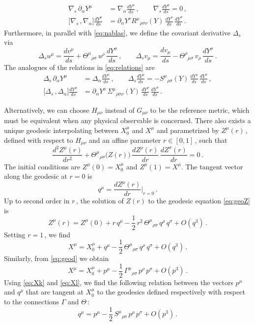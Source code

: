 \documentclass[11pt]{article}
\newcommand{\be}{\begin{equation}}
\newcommand{\ee}{\end{equation}}
\newcommand{\p}{\partial}
\begin{document}
%
\begin{subequations} \label{eq:relations}
\begin{align}
	\nabla_{\!s} \, \p_\alpha Y^\mu & = \nabla_{\!\alpha} \frac{dY^\mu}{ds}\,,
		\qquad
	\nabla_{\!s} \frac{dY^\mu}{ds} = 0\,, \\[4pt]
	\bigl[ \nabla_{\!s} \,, \! \nabla_{\!\alpha} \bigr] \frac{dY^\mu}{ds} & = \p_\alpha Y^\nu R^\mu{}_{\rho\sigma\nu} (Y) \, \frac{dY^\rho}{ds} \, \frac{dY^\sigma}{ds}\,.
\end{align}
\end{subequations}
%
Furthermore, in parallel with \eqref{eq:nablas}, we define the covariant derivative $\Delta_s$ via
%
\be
	\Delta_s u^\mu = \frac{d v^\mu}{ds} + \Theta^\mu{}_{\rho\sigma} \, u^\rho \, \frac{dY^\sigma}{ds}\,,
		\qquad
	\Delta_s v_\mu = \frac{dv_\mu}{ds} - \Theta^\rho{}_{\mu\sigma} \, v_\rho \, \frac{dY^\sigma}{ds} \,.
\ee
%
The analogues of the relations in \eqref{eq:relations} are
%
\begin{subequations}
\begin{align}
	\Delta_s \, \p_\alpha Y^\mu & = \Delta_\alpha \frac{dY^\mu}{ds}\,,
		\qquad
	\Delta_s \frac{dY^\mu}{ds} = - S^\mu{}_{\rho\sigma} (Y) \, \frac{dY^\rho}{ds} \, \frac{dY^\sigma}{ds}\,, \\[4pt]
	\bigl[ \Delta_s\,, \Delta_\alpha \bigr] \frac{dY^\mu}{ds} & = \p_\alpha Y^\nu \, \Sigma^\mu{}_{\rho\sigma\nu} (Y) \, \frac{dY^\rho}{ds} \, \frac{dY^\sigma}{ds}\,.
\end{align}
\end{subequations}
%

Alternatively, we can choose $H_{\mu\nu}$ instead of $G_{\mu\nu}$ to be the reference metric, which must be equivalent when any physical observable is concerned. There also exists a unique geodesic interpolating between $X_0^\mu$ and $X^\mu$ and parametrized by ${Z}^\mu (r)$\,, defined with respect to $H_{\mu\nu}$ and an affine parameter $r \in [0,1]$\,, such that
%
\be \label{eq:geoZ}
	\frac{d^2 {Z}^\mu (r)}{d r^2} + \Theta^\mu{}_{\rho\sigma} \bigl(Z(r)\bigr) \, \frac{d {Z}^\rho (r)}{dr} \, \frac{d {Z}^\sigma (r)}{d r} = 0\,.
\ee  
%
The initial conditions are ${Z}^\mu (0) = X_0^\mu$ and ${Z}^\mu (1) = X^\mu$. The tangent vector along the geodesic at $r=0$ is
%
\be \label{eq:defk}
	q^\mu = \frac{d{Z}^\mu(r)}{dr} \bigg|_{r=0}\,.
\ee
%
Up to second order in $r$\,, the solution of $Z(r)$ to the geodesic equation \eqref{eq:geoZ} is
%
\be
	Z^\mu (r) = Z^\mu (0) + r \, q^\mu - \frac{1}{2} \, r^2 \, \Theta^\mu{}_{\rho\sigma} \, q^\rho \, q^\sigma + O(q^3)\,.
\ee
%
Setting $r = 1$\,, we find
%
\be \label{eq:Xk}
	X^\mu = X_0^\mu + q^\mu - \frac{1}{2} \, \Theta^\mu{}_{\rho\sigma} \, q^\rho \, q^\sigma + O(q^3)\,.
\ee
%
Similarly, from \eqref{eq:geod} we obtain
%
\be \label{eq:Xl}
	X^\mu = X_0^\mu + p^\mu - \frac{1}{2} \, \Gamma^\mu{}_{\rho\sigma} \, p^\rho \, p^\sigma + O(p^3)\,.
\ee
%
Using \eqref{eq:Xk} and \eqref{eq:Xl}, we find the following relation between the vectors $p^\mu$ and $q^\mu$ that are tangent at $X^\mu_0$ to the geodesics defined respectively with respect to the connections $\Gamma$ and $\Theta$\,:
%
\be \label{eq:qpSpp}
	q^\mu = p^\mu - \frac{1}{2} \, S^\mu{}_{\rho\sigma} \, p^\rho \, p^\sigma + O(p^3)\,.
\ee
\end{document}
